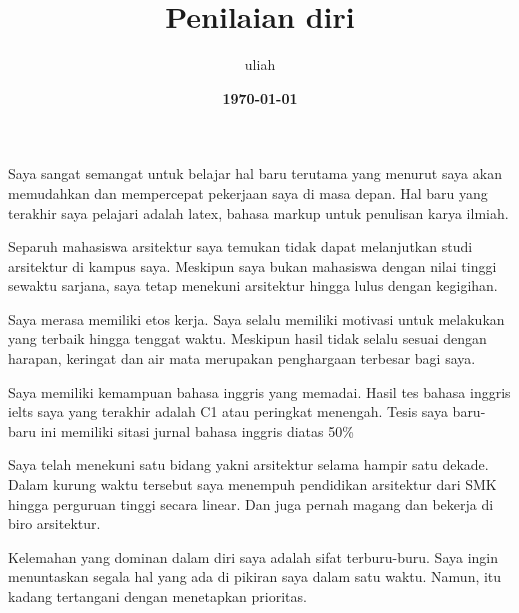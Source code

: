 \documentclass[../main.tex]{subfiles}
\title{
\textbf{Penilaian diri} \\
} %
\date{\textbf{\today}}
\author{uliah}
\begin{document}



\vspace{30pt} %



Saya sangat semangat untuk belajar hal baru terutama yang menurut saya akan memudahkan dan mempercepat pekerjaan saya di masa depan. Hal baru yang terakhir saya pelajari adalah latex, bahasa markup untuk penulisan karya ilmiah.

Separuh mahasiswa arsitektur saya temukan tidak dapat melanjutkan studi arsitektur di kampus saya. Meskipun saya bukan mahasiswa dengan nilai tinggi sewaktu sarjana, saya tetap menekuni arsitektur hingga lulus dengan kegigihan.

Saya merasa memiliki etos kerja. Saya selalu memiliki motivasi untuk melakukan yang terbaik hingga tenggat waktu. Meskipun hasil tidak selalu sesuai dengan harapan, keringat dan air mata merupakan penghargaan terbesar bagi saya.

Saya memiliki kemampuan bahasa inggris yang memadai. Hasil tes bahasa inggris ielts saya yang terakhir adalah C1 atau peringkat menengah. Tesis saya baru-baru ini memiliki sitasi jurnal bahasa inggris diatas 50\%

Saya telah menekuni satu bidang yakni arsitektur selama hampir satu dekade. Dalam kurung waktu tersebut saya menempuh pendidikan arsitektur dari SMK hingga perguruan tinggi secara linear. Dan juga pernah magang dan bekerja di biro arsitektur.


Kelemahan yang dominan dalam diri saya adalah sifat terburu-buru. Saya ingin menuntaskan segala hal yang ada di pikiran saya dalam satu waktu. Namun, itu kadang tertangani dengan menetapkan prioritas.
\end{document}
